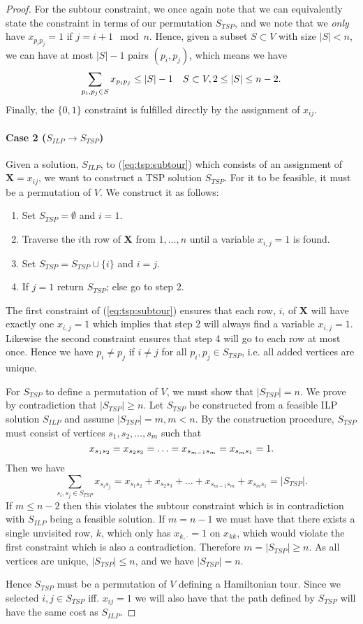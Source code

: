 \documentclass[11pt,a4paper,english]{article}
\begin{document}
\begin{proof}
For the subtour constraint, we once again note that we can equivalently state
the constraint in terms of our permutation $S_{TSP}$, and we note that we
\textit{only} have $x_{p_i p_j} = 1$ if $j = i + 1 \mod n$.
Hence, given a subset $S \subset V$ with size $|S| < n$, we can have at most
$|S| - 1$ pairs $(p_i, p_j)$, which means we have
$$\sum_{p_i,p_j \in S} x_{p_i p_j} \leq |S| - 1 \quad S \subset V, 2 \leq |S| \leq n-2\mathnormal{.}$$
Finally, the $\{0,1\}$ constraint is fulfilled directly by the
assignment of $x_{ij}$.
 \paragraph{Case 2 ($S_{ILP} \to S_{TSP}$)}
 Given a solution, $S_{ILP}$, to (\ref{eq:tsp:subtour}) which consists of an assignment of $\bm X = x_{ij}$, we want to construct a TSP solution $S_{TSP}$. For it to be feasible, it must be a permutation of $V$. We construct it as follows:
 \begin{enumerate}
 \item Set $S_{TSP} = \emptyset$ and $i = 1$.
 \item Traverse the $i$th row of $\bm X$ from $1,\dots,n$ until a variable $x_{i,j} = 1$ is found.
 \item Set $S_{TSP} = S_{TSP} \cup \{i\}$ and $i = j$.
 \item If $j = 1$ return $S_{TSP}$; else go to step 2.
 \end{enumerate}
 The first constraint of (\ref{eq:tsp:subtour}) ensures that each row, $i$,
 of $\bm X$ will
 have exactly one $x_{i,j} = 1$ which implies that step 2 will always find a
 variable $x_{i,j} = 1$. Likewise the second constraint ensures that step 4 will
 go to each row at most once. Hence we have $p_i \neq p_j$  if $i \neq j$
 for all $p_i, p_j \in S_{TSP}$, i.e. all added vertices are unique.

 For $S_{TSP}$ to define a permutation of $V$, we must show that $|S_{TSP}| = n$.
We prove by contradiction that $|S_{TSP}| \geq n$. Let $S_{TSP}$ be constructed from a feasible ILP solution $S_{ILP}$ and assume $|S_{TSP}| = m, m < n$. By the construction procedure, $S_{TSP}$ must consist of vertices $s_1,s_2,\dots,s_m$ such that
 $$x_{s_1 s_2} = x_{s_2 s_3} = \ldots = x_{s_{m-1} s_m} =  x_{s_{m} s_1} =  1\mathnormal{.}$$
Then we have
 $$\sum_{s_i, s_j\in S_{TSP}} x_{s_i s_j} = x_{s_1 s_2} + x_{s_2 s_3} + \ldots + x_{s_{m-1} s_m} +  x_{s_{m} s_1} = |S_{TSP}|.$$
If $m \leq n-2$ then this violates the subtour constraint which is in contradiction
  with $S_{ILP}$ being a feasible solution. If $m = n -1$ we
 must have that there exists a single unvisited row, $k$, which only has
 $x_{k,\cdot} = 1$ on $x_{kk}$, which would violate the first constraint which is
 also a contradiction.
Therefore $m = |S_{TSP}| \geq n$.  As all vertices are unique, $|S_{TSP}| \leq n$, and we have $|S_{TSP}| = n$.

 Hence $S_{TSP}$ must be a permutation of $V$ defining a Hamiltonian tour. Since
 we selected $i,j \in S_{TSP}$ iff. $x_{ij} = 1$ we will also have that
  the path defined by $S_{TSP}$ will have the same cost as $S_{ILP}$.
 \end{proof}
\end{document}
